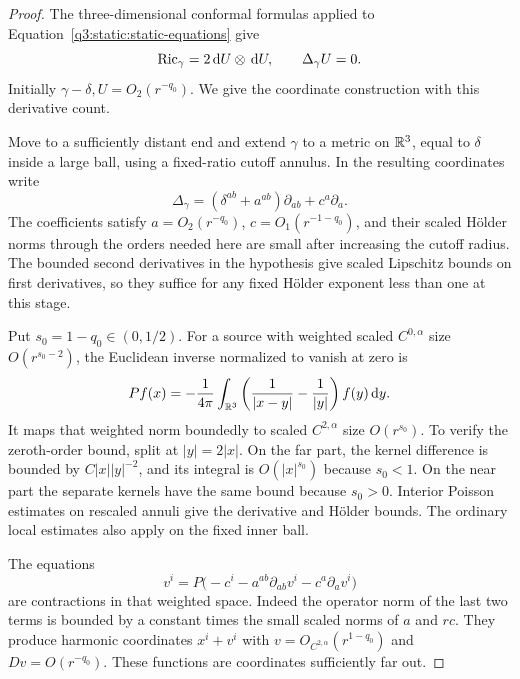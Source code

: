 \begin{proof}
The three-dimensional conformal formulas applied to
Equation~\eqref{q3:static:static-equations} give
\begin{equation}
\label{q3:static:gamma-equations}
\operatorname{Ric}_\gamma=2\,\mathrm d U\otimes\,\mathrm d U,\qquad \Delta_\gamma U=0.
\end{equation}
Initially \(\gamma-\delta,U=O_2(r^{-q_0})\).
We give the coordinate construction with this derivative count.

Move to a sufficiently distant end and extend \(\gamma\) to a
metric on \(\mathbb R^3\), equal to \(\delta\) inside a large ball,
using a fixed-ratio cutoff annulus.
In the resulting coordinates write
\[
\Delta_\gamma=(\delta^{ab}+a^{ab})\partial_{ab}+c^a\partial_a .
\]
The coefficients satisfy \(a=O_2(r^{-q_0})\),
\(c=O_1(r^{-1-q_0})\), and their scaled Hölder norms through
the orders needed here are small after increasing the cutoff radius.
The bounded second derivatives in the hypothesis give scaled
Lipschitz bounds on first derivatives, so they suffice for any fixed
Hölder exponent less than one at this stage.

Put \(s_0=1-q_0\in(0,1/2)\).
For a source with weighted scaled \(C^{0,\alpha}\) size
\(O(r^{s_0-2})\), the Euclidean inverse normalized to vanish at zero is
\begin{equation}
\label{q3:static:subtracted-newton}
Pf(x)=-\frac1{4\pi}\int_{\mathbb R^3}
\left(\frac1{|x-y|}-\frac1{|y|}\right)f(y)\,\mathrm d y.
\end{equation}
It maps that weighted norm boundedly to scaled
\(C^{2,\alpha}\) size \(O(r^{s_0})\).
To verify the zeroth-order bound, split at \(|y|=2|x|\).
On the far part, the kernel difference is bounded by
\(C|x||y|^{-2}\), and its integral is \(O(|x|^{s_0})\)
because \(s_0<1\).
On the near part the separate kernels have the same bound because
\(s_0>0\).
Interior Poisson estimates on rescaled annuli give the derivative
and Hölder bounds.
The ordinary local estimates also apply on the fixed inner ball.

The equations
\[
v^i=P\bigl(-c^i-a^{ab}\partial_{ab}v^i-c^a\partial_av^i\bigr)
\]
are contractions in that weighted space.
Indeed the operator norm of the last two terms is bounded by a
constant times the small scaled norms of \(a\) and \(rc\).
They produce harmonic coordinates \(x^i+v^i\) with
\(v=O_{C^{2,\alpha}}(r^{1-q_0})\) and
\(Dv=O(r^{-q_0})\).
These functions are coordinates sufficiently far out.


\end{proof}
